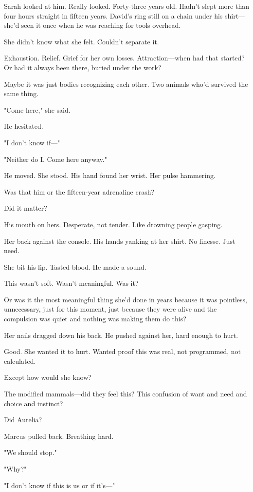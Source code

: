 Sarah looked at him. Really looked. Forty-three years old. Hadn't slept more than four hours straight in fifteen years. David's ring still on a chain under his shirt—she'd seen it once when he was reaching for tools overhead.

She didn't know what she felt. Couldn't separate it.

Exhaustion. Relief. Grief for her own losses. Attraction—when had that started? Or had it always been there, buried under the work?

Maybe it was just bodies recognizing each other. Two animals who'd survived the same thing.

"Come here," she said.

He hesitated.

"I don't know if—"

"Neither do I. Come here anyway."

He moved. She stood. His hand found her wrist. Her pulse hammering.

Was that him or the fifteen-year adrenaline crash?

Did it matter?

His mouth on hers. Desperate, not tender. Like drowning people gasping.

Her back against the console. His hands yanking at her shirt. No finesse. Just need.

She bit his lip. Tasted blood. He made a sound.

This wasn't soft. Wasn't meaningful. Was it?

Or was it the most meaningful thing she'd done in years because it was pointless, unnecessary, just for this moment, just because they were alive and the compulsion was quiet and nothing was making them do this?

Her nails dragged down his back. He pushed against her, hard enough to hurt.

Good. She wanted it to hurt. Wanted proof this was real, not programmed, not calculated.

Except how would she know?

The modified mammals—did they feel this? This confusion of want and need and choice and instinct?

Did Aurelia?

Marcus pulled back. Breathing hard.

"We should stop."

"Why?"

"I don't know if this is us or if it's—"

